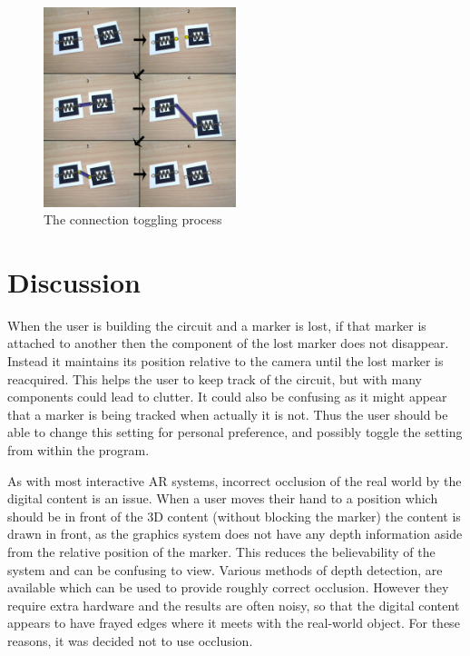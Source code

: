 \begin{figure}
\begin{center}
\includegraphics[width=0.50\textwidth]{connection}
\end{center}
\caption{The connection toggling process}
\label{connection}
\end{figure}

\section{Discussion}

When the user is building the circuit and a marker is lost, if that marker is attached to another then the component of the lost marker does not disappear. Instead it maintains its position relative to the camera until the lost marker is reacquired. This helps the user to keep track of the circuit, but with many components could lead to clutter. It could also be confusing as it might appear that a marker is being tracked when actually it is not. Thus the user should be able to change this setting for personal preference, and possibly toggle the setting from within the program.

As with most interactive AR systems, incorrect occlusion of the real world by the digital content is an issue. When a user moves their hand to a position which should be in front of the 3D content (without blocking the marker) the content is drawn in front, as the graphics system does not have any depth information aside from the relative position of the marker. This reduces the believability of the system and can be confusing to view. Various methods of depth detection, are available which can be used to provide roughly correct occlusion. However they require extra hardware and the results are often noisy, so that the digital content appears to have frayed edges where it meets with the real-world object. For these reasons, it was decided not to use occlusion.

